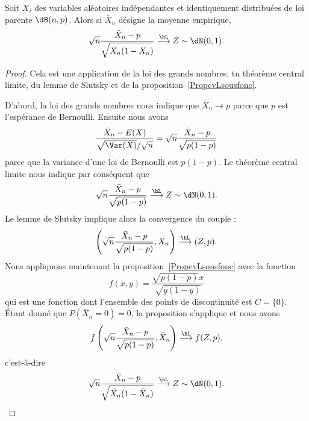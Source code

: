 \begin{proposition}     \label{PropLimxBNpxbxbsqrt}
    Soit \( X_i\) des variables aléatoires indépendantes et identiquement distribuées de loi parente \( \dB(n,p)\). Alors si \( \bar X_n\) désigne la moyenne empirique,
    \begin{equation}
        \sqrt{n}\frac{ \bar X_n-p }{ \sqrt{\bar X_n(1-\bar X_n)} }\stackrel{\hL}{\longrightarrow}Z\sim\dN(0,1).
    \end{equation}
\end{proposition}

\begin{proof}
    Cela est une application de la loi des grands nombres, tu théorème central limite, du lemme de Slutsky et de la proposition~\ref{PropcvLsousfonc}.

    D'abord, la loi des grands nombres nous indique que \( \bar X_n\to p\) parce que \( p\) est l'espérance de Bernoulli. Ensuite nous avons
    \begin{equation}
        \frac{ \bar X_n-E(X) }{ \sqrt{\Var(X)}/\sqrt{n} }=\sqrt{n}\frac{ \bar X_n-p }{ \sqrt{p(1-p)} }
    \end{equation}
    parce que la variance d'une loi de Bernoulli est \( p(1-p)\). Le théorème central limite nous indique par conséquent que
    \begin{equation}
        \sqrt{n}\frac{ \bar X_n-p }{ \sqrt{p(1-p)} }\stackrel{\hL}{\longrightarrow}Z\sim\dN(0,1).
    \end{equation}
    Le lemme de Slutsky implique alors la convergence du couple :
    \begin{equation}
        \left( \sqrt{n}\frac{ \bar X_n-p }{ \sqrt{p(1-p)} },\bar X_n \right)\stackrel{\hL}{\longrightarrow}(Z,p).
    \end{equation}
    Nous appliquons maintenant la proposition~\ref{PropcvLsousfonc} avec la fonction
    \begin{equation}
        f(x,y)=\frac{ \sqrt{p(1-p)}x }{ \sqrt{y(1-y)} }
    \end{equation}
    qui est une fonction dont l'ensemble des points de discontinuité est \( C=\{ 0 \}\). Étant donné que \( P(\bar X_n=0)=0\), la proposition s'applique et nous avons
    \begin{equation}
        f\left( \sqrt{n}\frac{ \bar X_n-p }{ \sqrt{p(1-p)} },\bar X_n \right)\stackrel{\hL}{\longrightarrow}f(Z,p),
    \end{equation}
    c'est-à-dire
    \begin{equation}
        \sqrt{n}\frac{ \bar X_n-p }{ \sqrt{\bar X_n(1-\bar X_n)} }\stackrel{\hL}{\longrightarrow}Z\sim\dN(0,1).
    \end{equation}
\end{proof}

